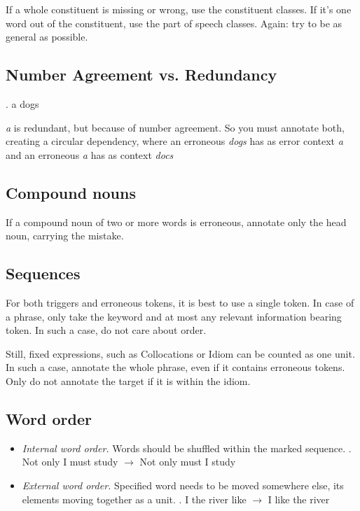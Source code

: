 \documentclass[12pt]{article}
\begin{document}
If a whole constituent is missing or wrong, use the constituent classes. If it's
one word out of the constituent, use the part of speech classes. Again: try to
be as general as possible.

\subsection{Number Agreement vs. Redundancy}

\ex. a dogs

\textit{a} is redundant, but because of number agreement. So you must annotate both,
creating a circular dependency, where an erroneous \textit{dogs} has as error
context \textit{a} and an erroneous \textit{a} has as context \textit{docs}

\subsection{Compound nouns}

If a compound noun of two or more words is erroneous, annotate only the head noun, carrying the mistake.

\subsection{Sequences}
For both triggers and erroneous tokens, it is best to use a single token. In
case of a phrase, only take the keyword and at most any relevant information
bearing token. In such a case, do not care about order.

Still, fixed expressions, such as  Collocations or Idiom can be counted as one
unit. In such a case, annotate the whole phrase, even if it contains erroneous
tokens. Only do not annotate the target if it is within the idiom.


\subsection{Word order}
\begin{itemize}
\item \textit{Internal word order.} Words should be shuffled within the marked sequence. 
\ex. Not only I must study $\to$ Not only must I study

\item \textit{External word order.} Specified word needs to be moved somewhere
else, its elements moving together as a unit.
\ex. I the river like $\to$ I like the river

\end{itemize}
\end{document}
